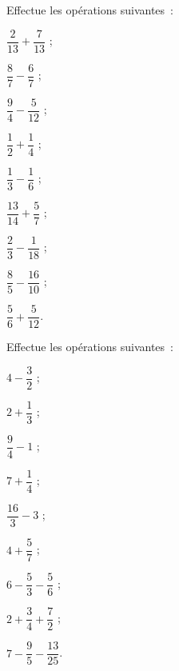 \begin{exercice}
Effectue les opérations suivantes : \\[0.1em]
\begin{colenumerate}{3}
 \item $\dfrac{2}{13} + \dfrac{7}{13}$ ;
 \vspace{0.2cm}
 \item $\dfrac{8}{7} - \dfrac{6}{7}$ ;
 \vspace{0.2cm}
 \item $\dfrac{9}{4} - \dfrac{5}{12}$ ;
 \item $\dfrac{1}{2} + \dfrac{1}{4}$ ;
 \item $\dfrac{1}{3} - \dfrac{1}{6}$ ;
 \item $\dfrac{13}{14} + \dfrac{5}{7}$ ;
 \item $\dfrac{2}{3} - \dfrac{1}{18}$ ;
 \item $\dfrac{8}{5} - \dfrac{16}{10}$ ;
  \item $\dfrac{5}{6} + \dfrac{5}{12}$.
 \end{colenumerate}
\end{exercice}


\begin{exercice}
Effectue les opérations suivantes : \\[0.1em]
\begin{colenumerate}{3}
 \item $4 - \dfrac{3}{2}$ ;
 \vspace{0.2cm}
 \item $2 + \dfrac{1}{3}$ ;
 \vspace{0.2cm}
 \item $\dfrac{9}{4} - 1$ ;
 \item $7 + \dfrac{1}{4}$ ;
 \item $\dfrac{16}{3} - 3$ ;
 \item $4 + \dfrac{5}{7}$ ;
 \item $6 - \dfrac{5}{3} - \dfrac{5}{6}$ ;
 \item $2 + \dfrac{3}{4} + \dfrac{7}{2}$ ;
  \item $7 - \dfrac{9}{5} - \dfrac{13}{25}$.
 \end{colenumerate}
\end{exercice}


